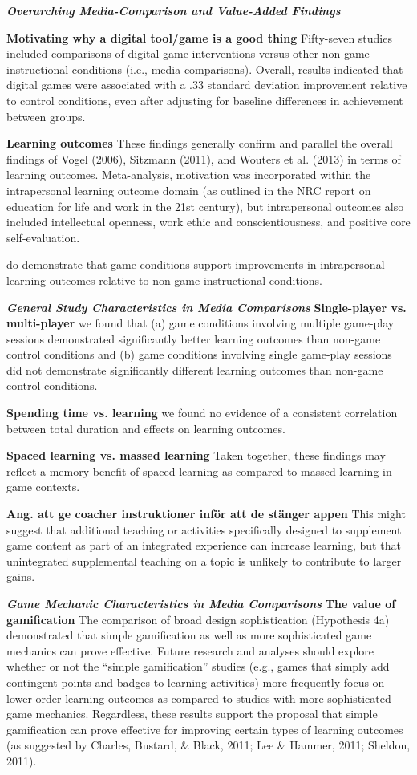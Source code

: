 \textbf{\textit{Overarching Media-Comparison and Value-Added Findings}}

\textbf{Motivating why a digital tool/game is a good thing}
Fifty-seven studies included comparisons of digital game interventions versus other non-game instructional conditions (i.e., media comparisons). Overall, results indicated that digital games were associated with a .33 standard deviation improvement relative to control conditions, even after adjusting for baseline differences in achievement between groups.

\textbf{Learning outcomes}
These findings generally confirm and parallel the overall findings of Vogel (2006), Sitzmann (2011), and Wouters et al. (2013) in terms of learning outcomes. Meta-analysis, motivation was incorporated within the intrapersonal learning outcome domain (as outlined in the NRC report on education for life and work in the 21st century), but intrapersonal outcomes also included intellectual openness, work ethic and conscientiousness, and positive core self-evaluation.

do demonstrate that game conditions support improvements in intrapersonal learning outcomes relative to non-game instructional conditions.

\textbf{\textit{General Study Characteristics in Media Comparisons}}
\textbf{Single-player vs. multi-player}
we found that (a) game conditions involving multiple game-play sessions demonstrated significantly better learning outcomes than non-game control conditions and (b) game conditions involving single game-play sessions did not demonstrate significantly different learning outcomes than non-game control conditions.

\textbf{Spending time vs. learning}
we found no evidence of a consistent correlation between total duration and effects on learning outcomes.

\textbf{Spaced learning vs. massed learning}
Taken together, these findings may reflect a memory benefit of spaced learning as compared to massed learning in game contexts.

\textbf{Ang. att ge coacher instruktioner inför att de stänger appen}
This might suggest that additional teaching or activities specifically designed to supplement game content as part of an integrated experience can increase learning, but that unintegrated supplemental teaching on a topic is unlikely to contribute to larger gains.

\textbf{\textit{Game Mechanic Characteristics in Media Comparisons}}
\textbf{The value of gamification}
The comparison of broad design sophistication (Hypothesis 4a) demonstrated that simple gamification as well as more sophisticated game mechanics can prove effective. Future research and analyses should explore whether or not the “simple gamification” studies (e.g., games that simply add contingent points and badges to learning activities) more frequently focus on lower-order learning outcomes as compared to studies with more sophisticated game mechanics. Regardless, these results support the proposal that simple gamification can prove effective for improving certain types of learning outcomes (as suggested by Charles, Bustard, \& Black, 2011; Lee \& Hammer, 2011; Sheldon, 2011).

